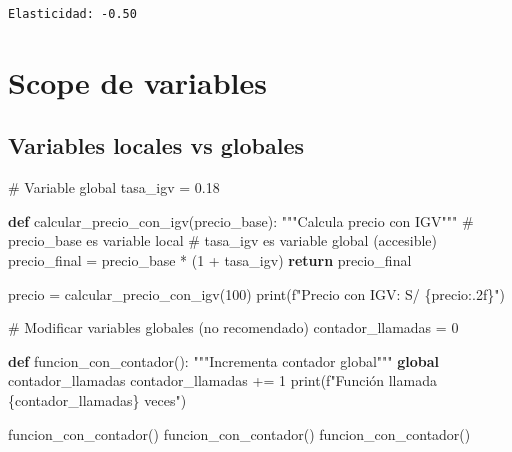 \documentclass[
  doc,
  floatsintext,
  longtable,
  a4paper,
  nolmodern,
  notxfonts,
  notimes,
  12pt,
  colorlinks=true,linkcolor=blue,citecolor=blue,urlcolor=blue]{apa7}
\newenvironment{Shaded}{\begin{snugshade}}{\end{snugshade}}
\newcommand{\BuiltInTok}[1]{\textcolor[rgb]{0.00,0.23,0.31}{#1}}
\newcommand{\CommentTok}[1]{\textcolor[rgb]{0.37,0.37,0.37}{#1}}
\newcommand{\ControlFlowTok}[1]{\textcolor[rgb]{0.00,0.23,0.31}{\textbf{#1}}}
\newcommand{\DecValTok}[1]{\textcolor[rgb]{0.68,0.00,0.00}{#1}}
\newcommand{\FloatTok}[1]{\textcolor[rgb]{0.68,0.00,0.00}{#1}}
\newcommand{\KeywordTok}[1]{\textcolor[rgb]{0.00,0.23,0.31}{\textbf{#1}}}
\newcommand{\NormalTok}[1]{\textcolor[rgb]{0.00,0.23,0.31}{#1}}
\newcommand{\OperatorTok}[1]{\textcolor[rgb]{0.37,0.37,0.37}{#1}}
\newcommand{\SpecialCharTok}[1]{\textcolor[rgb]{0.37,0.37,0.37}{#1}}
\newcommand{\SpecialStringTok}[1]{\textcolor[rgb]{0.13,0.47,0.30}{#1}}
\begin{document}
\begin{verbatim}
Elasticidad: -0.50
\end{verbatim}

\section{Scope de variables}\label{scope-de-variables}

\subsection{Variables locales vs
globales}\label{variables-locales-vs-globales}

\begin{Shaded}
\begin{Highlighting}[]
\CommentTok{\# Variable global}
\NormalTok{tasa\_igv }\OperatorTok{=} \FloatTok{0.18}

\KeywordTok{def}\NormalTok{ calcular\_precio\_con\_igv(precio\_base):}
    \CommentTok{"""Calcula precio con IGV"""}
    \CommentTok{\# precio\_base es variable local}
    \CommentTok{\# tasa\_igv es variable global (accesible)}
\NormalTok{    precio\_final }\OperatorTok{=}\NormalTok{ precio\_base }\OperatorTok{*}\NormalTok{ (}\DecValTok{1} \OperatorTok{+}\NormalTok{ tasa\_igv)}
    \ControlFlowTok{return}\NormalTok{ precio\_final}

\NormalTok{precio }\OperatorTok{=}\NormalTok{ calcular\_precio\_con\_igv(}\DecValTok{100}\NormalTok{)}
\BuiltInTok{print}\NormalTok{(}\SpecialStringTok{f"Precio con IGV: S/ }\SpecialCharTok{\{}\NormalTok{precio}\SpecialCharTok{:.2f\}}\SpecialStringTok{"}\NormalTok{)}

\CommentTok{\# Modificar variables globales (no recomendado)}
\NormalTok{contador\_llamadas }\OperatorTok{=} \DecValTok{0}

\KeywordTok{def}\NormalTok{ funcion\_con\_contador():}
    \CommentTok{"""Incrementa contador global"""}
    \KeywordTok{global}\NormalTok{ contador\_llamadas}
\NormalTok{    contador\_llamadas }\OperatorTok{+=} \DecValTok{1}
    \BuiltInTok{print}\NormalTok{(}\SpecialStringTok{f"Función llamada }\SpecialCharTok{\{}\NormalTok{contador\_llamadas}\SpecialCharTok{\}}\SpecialStringTok{ veces"}\NormalTok{)}

\NormalTok{funcion\_con\_contador()}
\NormalTok{funcion\_con\_contador()}
\NormalTok{funcion\_con\_contador()}
\end{Highlighting}
\end{Shaded}
\end{document}
